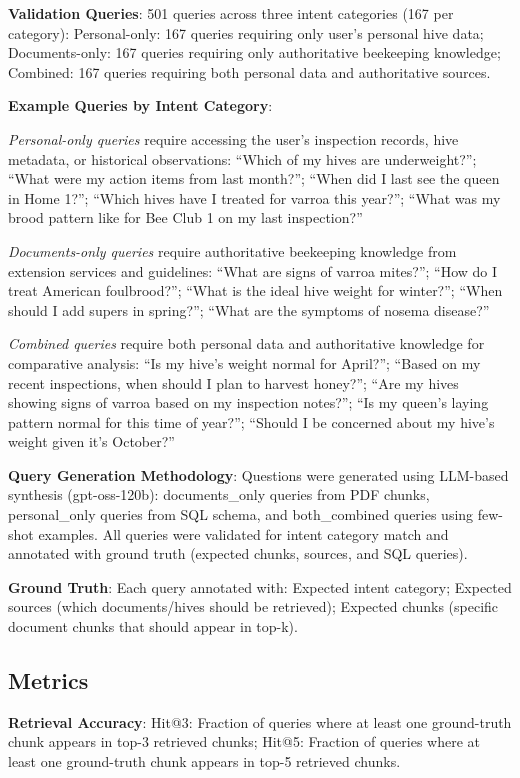 \documentclass[twocolumn,10pt]{article}
\begin{document}
\textbf{Validation Queries}: 501 queries across three intent categories (167 per category): Personal-only: 167 queries requiring only user's personal hive data; Documents-only: 167 queries requiring only authoritative beekeeping knowledge; Combined: 167 queries requiring both personal data and authoritative sources.

\textbf{Example Queries by Intent Category}:

\emph{Personal-only queries} require accessing the user's inspection records, hive metadata, or historical observations: ``Which of my hives are underweight?''; ``What were my action items from last month?''; ``When did I last see the queen in Home 1?''; ``Which hives have I treated for varroa this year?''; ``What was my brood pattern like for Bee Club 1 on my last inspection?''

\emph{Documents-only queries} require authoritative beekeeping knowledge from extension services and guidelines: ``What are signs of varroa mites?''; ``How do I treat American foulbrood?''; ``What is the ideal hive weight for winter?''; ``When should I add supers in spring?''; ``What are the symptoms of nosema disease?''

\emph{Combined queries} require both personal data and authoritative knowledge for comparative analysis: ``Is my hive's weight normal for April?''; ``Based on my recent inspections, when should I plan to harvest honey?''; ``Are my hives showing signs of varroa based on my inspection notes?''; ``Is my queen's laying pattern normal for this time of year?''; ``Should I be concerned about my hive's weight given it's October?''

\textbf{Query Generation Methodology}: Questions were generated using LLM-based synthesis (gpt-oss-120b): documents\_only queries from PDF chunks, personal\_only queries from SQL schema, and both\_combined queries using few-shot examples. All queries were validated for intent category match and annotated with ground truth (expected chunks, sources, and SQL queries).

\textbf{Ground Truth}: Each query annotated with: Expected intent category; Expected sources (which documents/hives should be retrieved); Expected chunks (specific document chunks that should appear in top-k).

\subsection{Metrics}

\textbf{Retrieval Accuracy}: Hit@3: Fraction of queries where at least one ground-truth chunk appears in top-3 retrieved chunks; Hit@5: Fraction of queries where at least one ground-truth chunk appears in top-5 retrieved chunks.
\end{document}

